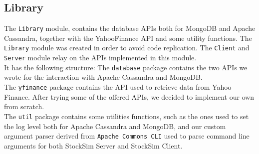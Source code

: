 \subsection{Library}
The \texttt{Library} module, contains the database APIs both for MongoDB and
Apache Cassandra, together with the YahooFinance API and some utility functions.
The \texttt{Library} module was created in order to avoid code replication. The
\texttt{Client} and \texttt{Server} module relay on the APIs implemented in this
module.\\
It has the following structure:
\vspace{0.2cm}
\vspace{0.2cm}
\noindent The \texttt{database} package contains the two APIs we wrote for the
interaction with Apache Cassandra and MongoDB.\\
The \texttt{yfinance} package contains the API used to retrieve data from
Yahoo Finance. After trying some of the offered APIs, we decided to implement
our own from scratch.\\
The \texttt{util} package contains some utilities functions, such as the ones 
used to set the log level both for Apache Cassandra and MongoDB, and our custom
argument parser derived from \texttt{Apache Commons CLI} used to parse command
line arguments for both StockSim Server and StockSim Client.
